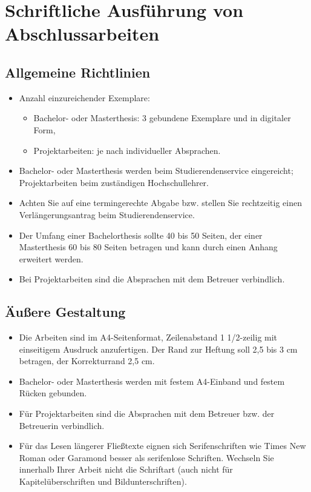 \section{Schriftliche Ausführung von Abschlussarbeiten}

\subsection{Allgemeine Richtlinien}

\begin{itemize}
\item Anzahl einzureichender Exemplare:
\begin{itemize}
\item Bachelor- oder Masterthesis: 3 gebundene Exemplare und in digitaler Form, 
\item Projektarbeiten: je nach individueller Absprachen.
\end{itemize}

\item Bachelor- oder Masterthesis werden beim Studierendenservice eingereicht; Projektarbeiten beim zuständigen Hochschullehrer.
\item Achten Sie auf eine termingerechte Abgabe bzw. stellen Sie rechtzeitig einen Verlängerungsantrag beim Studierendenservice.
\item Der Umfang einer Bachelorthesis sollte 40 bis 50 Seiten, der einer Masterthesis 60 bis 80 Seiten betragen und kann durch einen Anhang erweitert werden.
\item Bei Projektarbeiten sind die Absprachen mit dem Betreuer verbindlich.

\end{itemize}


\subsection{Äußere Gestaltung }

\begin{itemize}
\item Die Arbeiten sind im A4-Seitenformat, Zeilenabstand 1 1/2-zeilig mit einseitigem Ausdruck anzufertigen. Der Rand zur Heftung soll 2,5 bis 3 cm betragen, der Korrekturrand 2,5 cm.
\item Bachelor- oder Masterthesis werden mit festem A4-Einband und festem Rücken gebunden.
\item Für Projektarbeiten sind die Absprachen mit dem Betreuer bzw. der Betreuerin verbindlich.
\item Für das Lesen längerer Fließtexte eignen sich Serifenschriften wie Times New Roman oder Garamond besser als serifenlose Schriften. Wechseln Sie innerhalb Ihrer Arbeit nicht die Schriftart (auch nicht für Kapitelüberschriften und Bildunterschriften).
\end{itemize}

